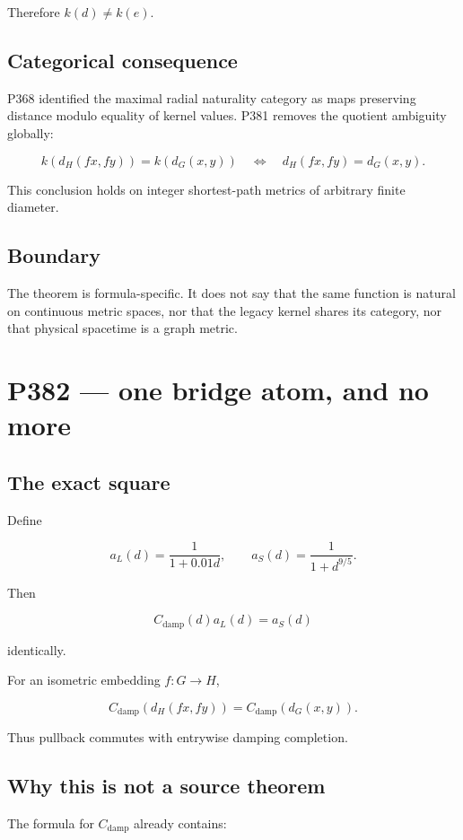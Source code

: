 \documentclass[11pt,a4paper,openany]{report}
\begin{document}
Therefore \(k(d)\neq k(e)\).

\section{Categorical consequence}

P368 identified the maximal radial naturality category as maps preserving distance modulo equality of kernel values. P381 removes the quotient ambiguity globally:

\[
k(d_H(fx,fy))=k(d_G(x,y))
\quad\Longleftrightarrow\quad
d_H(fx,fy)=d_G(x,y).
\]

This conclusion holds on integer shortest-path metrics of arbitrary finite diameter.

\section{Boundary}

The theorem is formula-specific. It does not say that the same function is natural on continuous metric spaces, nor that the legacy kernel shares its category, nor that physical spacetime is a graph metric.

\chapter{P382 --- one bridge atom, and no more}

\section{The exact square}

Define

\[
a_L(d)=\frac{1}{1+0.01d},
\qquad
a_S(d)=\frac{1}{1+d^{9/5}}.
\]

Then

\[
C_{\mathrm{damp}}(d)a_L(d)=a_S(d)
\]

identically.

For an isometric embedding \(f:G\to H\),

\[
C_{\mathrm{damp}}(d_H(fx,fy))
=
C_{\mathrm{damp}}(d_G(x,y)).
\]

Thus pullback commutes with entrywise damping completion.

\section{Why this is not a source theorem}

The formula for \(C_{\mathrm{damp}}\) already contains:
\end{document}
